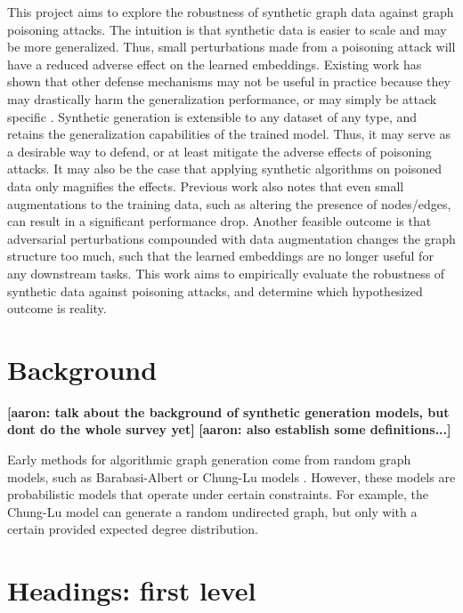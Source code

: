 \documentclass{article}
\newcommand{\aaron}[2]{{\color{orange}\bfseries [aaron: #1]}}
\begin{document}
This project aims to explore the robustness of synthetic graph data against graph poisoning attacks. The intuition is that synthetic data is easier to scale and may be more generalized. Thus, small perturbations made from a poisoning attack will have a reduced adverse effect on the learned embeddings. Existing work has shown that other defense mechanisms may not be useful in practice because they may drastically harm the generalization performance, or may simply be attack specific \cite{liu2023friendly}. Synthetic generation is extensible to any dataset of any type, and retains the generalization capabilities of the trained model. Thus, it may serve as a desirable way to defend, or at least mitigate the adverse effects of poisoning attacks. It may also be the case that applying synthetic algorithms on poisoned data only magnifies the effects. Previous work also notes that even small augmentations to the training data, such as altering the presence of nodes/edges, can result in a significant performance drop. Another feasible outcome is that adversarial perturbations compounded with data augmentation changes the graph structure too much, such that the learned embeddings are no longer useful for any downstream tasks. This work aims to empirically evaluate the robustness of synthetic data against poisoning attacks, and determine which hypothesized outcome is reality. 

\section{Background}
\label{background}

\aaron{talk about the background of synthetic generation models, but dont do the whole survey yet}{}
\aaron{also establish some definitions...}{}

Early methods for algorithmic graph generation come from random graph models, such as Barabasi-Albert \cite{barabasi-albert} or Chung-Lu models \cite{chunglu}. However, these models are probabilistic models that operate under certain constraints. For example, the Chung-Lu model can generate a random undirected graph, but only with a certain provided expected degree distribution. 






\section{Headings: first level}
\label{headings}
\end{document}
